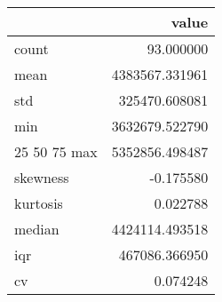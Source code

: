 \begin{tabular}{lr}
\toprule
 & value \\
\midrule
count & 93.000000 \\
mean & 4383567.331961 \\
std & 325470.608081 \\
min & 3632679.522790 \\
25%
50%
75%
max & 5352856.498487 \\
skewness & -0.175580 \\
kurtosis & 0.022788 \\
median & 4424114.493518 \\
iqr & 467086.366950 \\
cv & 0.074248 \\
\bottomrule
\end{tabular}

